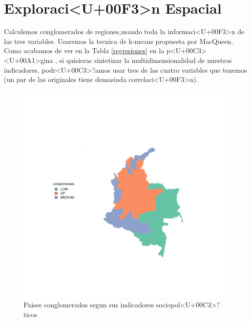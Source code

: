 \section{Exploraci<U+00F3>n Espacial}
Calculemos conglomerados de regiones,usando toda la informaci<U+00F3>n de las tres variables.
Usaremos la tecnica de k-means propuesta por MacQueen.\cite{reynolds_clustering_2006}
Como acabamos de ver en la Tabla \ref{regresiones} en la p<U+00C3><U+00A1>gina \pageref{regresiones}, si quisieras sintetizar la multidimensionalidad de nuestros indicadores, podr<U+00C3>?amos usar tres de las cuatro variables que tenemos (un par de las originales tiene demasiada correlaci<U+00F3>n).
%
%
%
%
%
%
\begin{figure}[h]
\centering
\includegraphics{ejemplo-plotMap1}
\caption{Paises conglomerados segun sus indicadores sociopol<U+00C3>?ticos}\label{clustmap}
\end{figure}
%

\renewcommand{\refname}{Bibliography}


